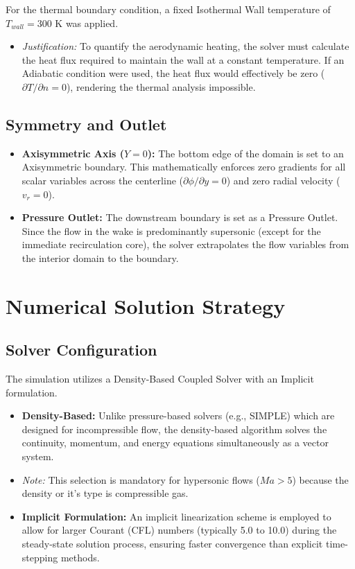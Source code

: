 For the thermal boundary condition, a fixed Isothermal Wall temperature of $T_{wall} = 300$ K was applied. 
\begin{itemize}
    \item \textit{Justification:} To quantify the aerodynamic heating, the solver must calculate the heat flux required to maintain the wall at a constant temperature. If an Adiabatic condition were used, the heat flux would effectively be zero ($ \partial T / \partial n = 0$), rendering the thermal analysis impossible.
\end{itemize}

\subsection{Symmetry and Outlet}
\begin{itemize}
    \item \textbf{Axisymmetric Axis ($Y=0$):} The bottom edge of the domain is set to an Axisymmetric boundary. This mathematically enforces zero gradients for all scalar variables across the centerline ($\partial \phi / \partial y = 0$) and zero radial velocity ($v_r = 0$).
    \item \textbf{Pressure Outlet:} The downstream boundary is set as a Pressure Outlet. Since the flow in the wake is predominantly supersonic (except for the immediate recirculation core), the solver extrapolates the flow variables from the interior domain to the boundary.
\end{itemize}


\section{Numerical Solution Strategy}
\subsection{Solver Configuration}
The simulation utilizes a Density-Based Coupled Solver with an Implicit formulation.

\begin{itemize}
    \item \textbf{Density-Based:} Unlike pressure-based solvers (e.g., SIMPLE) which are designed for incompressible flow, the density-based algorithm solves the continuity, momentum, and energy equations simultaneously as a vector system. 
    \item \textit{Note:} This selection is mandatory for hypersonic flows ($Ma > 5$) because the density or it's type is compressible gas.
    
    \item \textbf{Implicit Formulation:} An implicit linearization scheme is employed to allow for larger Courant (CFL) numbers (typically 5.0 to 10.0) during the steady-state solution process, ensuring faster convergence than explicit time-stepping methods.
\end{itemize}

